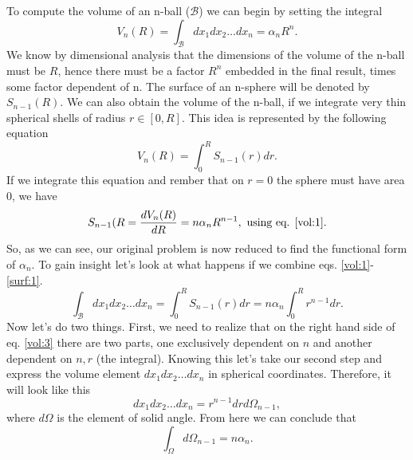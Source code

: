 
\begin{questions}
\begin{solution}
  To compute the volume of an n-ball ($\mathcal{B}$) we can begin by setting the integral
  \begin{equation}
    V_n(R) = \int_{\mathcal{B}} dx_1dx_2\ldots dx_n = \alpha_nR^n.
    \label{vol:1}
  \end{equation}
  We know by dimensional analysis that the dimensions of the volume of the n-ball must be $R$, hence there must be a factor $R^n$ embedded in the final result, times some factor dependent of n.
  The surface of an n-sphere will be denoted by $S_{n-1}(R)$. We can also obtain the volume of the n-ball, if we integrate very thin spherical shells of radius $r\in[0,R]$. This idea is represented by the following equation \begin{equation}
    V_n(R) = \int_0^R S_{n-1}(r)dr.
    \label{vol:2}
  \end{equation}
  If we integrate this equation and rember that on $r=0$ the sphere must have area $0$, we have
  \begin{equation}
    S_{n-1}(R = \frac{dV_n(R)}{dR} = n\alpha_nR^{n-1}, \text{ using eq. \ref{vol:1}.}
    \label{surf:1}
  \end{equation}
  So, as we can see, our original problem is now reduced to find the functional form of $\alpha_n$. To gain insight let's look at what happens if we combine eqs. \ref{vol:1}-\ref{surf:1}.
  \begin{equation}
    \int_{\mathcal{B}} dx_1dx_2\ldots dx_n = \int_0^R S_{n-1}(r)dr = n\alpha_n\int_0^R r^{n-1} dr.
    \label{vol:3}
  \end{equation}
  Now let's do two things. First, we need to realize that on the right hand side of eq. \ref{vol:3} there are two parts, one exclusively dependent on $n$ and another dependent on $n,r$ (the integral). Knowing this let's take our second step and express the volume element $dx_1dx_2\ldots dx_n$ in spherical coordinates. Therefore, it will look like this
  \begin{equation}
    dx_1dx_2\ldots dx_n = r^{n-1}drd\Omega_{n-1},
  \end{equation}
  where $d\Omega$ is the element of solid angle. From here we can conclude that
  \begin{equation}
    \int_{\Omega} d\Omega_{n-1} = n\alpha_n.
    \label{om:alp}
  \end{equation}


\end{solution}
\end{questions}

